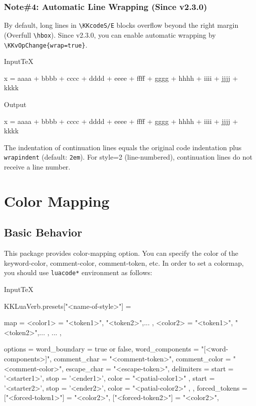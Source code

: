 \documentclass[luatex,fontsize=8pt,paper=b5,twoside]{jlreq}%
\begin{document}
\subsubsection{Note\#4: Automatic Line Wrapping (Since v2.3.0)}
\KKvScanOff
By default, long lines in \verb|\KKcodeS/E| blocks overflow beyond the right margin (Overfull \verb|\hbox|). Since v2.3.0, you can enable automatic wrapping by \verb|\KKvOpChange{wrap=true}|.

\begin{SourceCode}{Input}{TeX}

  \KKcodeS
  x = aaaa + bbbb + cccc + dddd + eeee + ffff + gggg + hhhh + iiii + jjjj + kkkk
  \KKcodeE

\end{SourceCode}
\KKvScanOn
\begin{OutPut}{Output}

\KKcodeS
x = aaaa + bbbb + cccc + dddd + eeee + ffff + gggg + hhhh + iiii + jjjj + kkkk
\KKcodeE

\end{OutPut}
\KKvScanOff

The indentation of continuation lines equals the original code indentation plus \verb|wrapindent| (default: \verb|2em|). For style=2 (line-numbered), continuation lines do not receive a line number.
\KKvScanOn

\section{Color Mapping}
\KKvScanOff
\subsection{Basic Behavior}
This package provides color-mapping option. You can specify the color of the keyword-color, comment-color, comment-token, etc. 
In order to set a colormap, you should use \verb|luacode*| environment as follows:

\begin{SourceCode}{Input}{TeX}
  \begin{luacode*}
    KKLuaVerb.presets["<name-of-style>"] = {
      map = { 
        <color1> = { "<token1>", "<token2>",... },              
        <color2> = { "<token1>", "<token2>",... },
        ...
      }, 
      
      options = { 
        word_boundary = true or false,  
        word_components = "[<word-components>]",
        comment_char = "<comment-token>",     
        comment_color = "<comment-color>", 
        escape_char = "<escape-token>",
        delimiters = {
          { start = '<starter1>', stop = '<ender1>', color = "<patial-color1>" },
          { start = '<starter2>', stop = '<ender2>', color = "<patial-color2>" },
        },
        forced_tokens = {
          ["<forced-token1>"] = "<color2>",
          ["<forced-token2>"] = "<color2>",
        }
      }
    }
  \end{luacode*}
\end{SourceCode}
\end{document}
